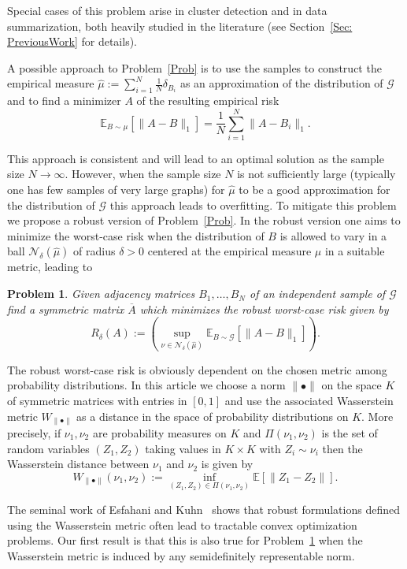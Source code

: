 \documentclass[12pt]{amsart}
\newtheorem{problem}[lemma]{Problem}
\theoremstyle{remark}
\newcommand{\EE}{\mathbb{E}}
\newcommand{\grG}{{\mathcal{G}}}
\begin{document}
Special cases of this problem arise in cluster detection and in data summarization, both heavily studied in the literature (see Section~\ref{Sec: PreviousWork} for details).

A possible approach to Problem~\ref{Prob} is to use the samples to construct the empirical measure $\hat{\mu}:=\sum_{i=1}^N \frac{1}{N}\delta_{B_i}$ as an approximation of the distribution of $\grG$ and to find a minimizer $A$ of the resulting empirical risk
\[ \EE_{B\sim \mu}[\|A-B\|_1]=\frac{1}{N}\sum_{i=1}^N \|A-B_i\|_1.\]

This approach is consistent and will lead to an optimal solution as the sample size $N\rightarrow \infty$. However, when the sample size $N$ is not sufficiently large (typically one has few samples of very large graphs) for $\hat{\mu}$ to be a good approximation for the distribution of $\grG$ this approach leads to overfitting. To mitigate this problem we propose a robust version of Problem~\ref{Prob}. In the robust version one aims to minimize the worst-case risk when the distribution of $B$ is allowed to vary in a ball $\mathcal{N}_{\delta}(\hat{\mu})$ of radius $\delta>0$ centered at the empirical measure $\hat{\mu}$ in a suitable metric, leading to 

\begin{problem}\label{ProbRobusto} Given adjacency matrices $B_1,\dots, B_N$ of an independent sample of $\grG$ find a symmetric matrix $\overline{A}$ which minimizes the robust worst-case risk given by
\[R_{\delta}(A):=\left(\sup_{\nu\in \mathcal{N}_{\delta}(\hat{\mu})} \EE_{B\sim \grG}[\|A-B\|_1]\right).\] 
\end{problem}
The robust worst-case risk is obviously dependent on the chosen metric among probability distributions. In this article we choose a norm $\|\bullet\|$ on the space $K$ of symmetric matrices with entries in $[0,1]$ and use the associated Wasserstein metric $W_{\|\bullet\|}$ as a distance in the space of probability distributions on $K$. More precisely, if $\nu_1,\nu_2$ are probability measures on $K$ and $\Pi(\nu_1,\nu_2)$ is the set of random variables $(Z_1,Z_2)$ taking values in $K\times K$  with $Z_i\sim \nu_i$ then the Wasserstein distance between $\nu_1$ and $\nu_2$ is given by 
\[ W_{\|\bullet\|}(\nu_1,\nu_2):=\inf_{(Z_1,Z_2)\in \Pi(\nu_1,\nu_2)} \EE[\|Z_1-Z_2\|].\]

The seminal work of Esfahani and Kuhn~\cite{EsfahaniKuhn} shows that robust formulations defined using the Wasserstein metric often lead to tractable convex optimization problems. Our first result is that this is also true for Problem~\ref{ProbRobusto} when the Wasserstein metric is induced by any semidefinitely representable norm.
\end{document}
